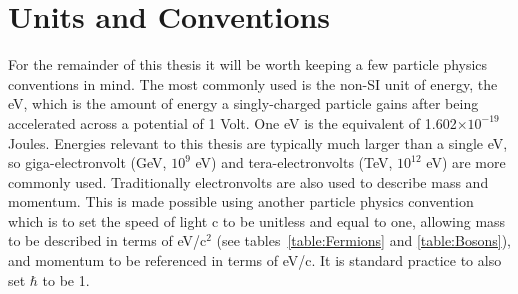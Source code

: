 \section{Units and Conventions}
 
For the remainder of this thesis it will be worth keeping a few particle physics conventions in mind.  
The most commonly used is the non-SI unit of energy, the \gls{eV}, which is the amount of energy a singly-charged particle gains after being accelerated across a potential of 1 Volt.  
One eV is the equivalent of 1.602$\times 10^{-19}$ Joules.  
Energies relevant to this thesis are typically much larger than a single eV, so giga-electronvolt (GeV, $10^9$ eV) and tera-electronvolts  (TeV, $10^{12}$ eV) are more commonly used.  
Traditionally electronvolts are also used to describe mass and momentum.  
This is made possible using another particle physics convention which is to set the speed of light c to be unitless and equal to one, allowing mass to be described in terms of eV/c$^2$ (see tables~\ref{table:Fermions} and \ref{table:Bosons}), and momentum to be referenced in terms of eV/c.  
It is standard practice to also set  $\hbar$ to be 1.  


